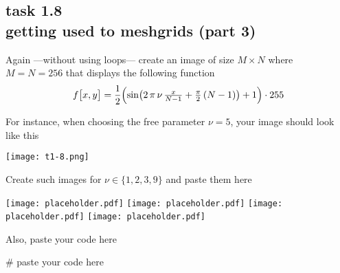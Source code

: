 
\subsection*{task 1.8 \\[1ex] getting used to meshgrids (part 3)}

Again ---without using  loops--- create an image of size $M \times N$ where $M = N = 256$ that displays the following function
\begin{equation*}
f \bigl[ x, y \bigr] = \frac{1}{2} \Bigl( \sin \bigl( 2\,\pi\,\nu \, \tfrac{x}{N-1} + \tfrac{\pi}{2} \, (N-1)\bigr) + 1 \Bigr) \cdot 255
\end{equation*}

For instance, when choosing the free parameter $\nu = 5$, your image should look like this
\begin{center}
\texttt{[image: t1-8.png]} 
\end{center}

\vspace{1cm}
Create such images for $\nu \in \{ 1, 2, 3, 9 \}$ and paste them here
\begin{center}
\texttt{[image: placeholder.pdf]} \hfill
\texttt{[image: placeholder.pdf]} \hfill
\texttt{[image: placeholder.pdf]} \hfill
\texttt{[image: placeholder.pdf]} 
\end{center}



\newpage
Also, paste your code here \\[1ex]
\begin{python}
# paste your code here

\end{python}






